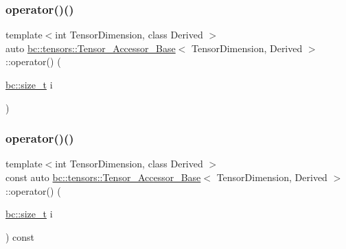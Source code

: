 \subsubsection{\texorpdfstring{operator()()}{operator()()}\hspace{0.1cm}{\footnotesize\ttfamily [1/2]}}
{\footnotesize\ttfamily template$<$int Tensor\+Dimension, class Derived $>$ \\
auto \hyperlink{classbc_1_1tensors_1_1Tensor__Accessor__Base}{bc\+::tensors\+::\+Tensor\+\_\+\+Accessor\+\_\+\+Base}$<$ Tensor\+Dimension, Derived $>$\+::operator() (\begin{DoxyParamCaption}\item[{\hyperlink{namespacebc_aaf8e3fbf99b04b1b57c4f80c6f55d3c5}{bc\+::size\+\_\+t}}]{i }\end{DoxyParamCaption})\hspace{0.3cm}{\ttfamily [inline]}}

\mbox{\label{classbc_1_1tensors_1_1Tensor__Accessor__Base_a0daa2d515a7b9af5fe7d31742aa6eb32}} 
\subsubsection{\texorpdfstring{operator()()}{operator()()}\hspace{0.1cm}{\footnotesize\ttfamily [2/2]}}
{\footnotesize\ttfamily template$<$int Tensor\+Dimension, class Derived $>$ \\
const auto \hyperlink{classbc_1_1tensors_1_1Tensor__Accessor__Base}{bc\+::tensors\+::\+Tensor\+\_\+\+Accessor\+\_\+\+Base}$<$ Tensor\+Dimension, Derived $>$\+::operator() (\begin{DoxyParamCaption}\item[{\hyperlink{namespacebc_aaf8e3fbf99b04b1b57c4f80c6f55d3c5}{bc\+::size\+\_\+t}}]{i }\end{DoxyParamCaption}) const\hspace{0.3cm}{\ttfamily [inline]}}

\mbox{\label{classbc_1_1tensors_1_1Tensor__Accessor__Base_ad6a8f0474abed58f4f951ce023855050}} 
